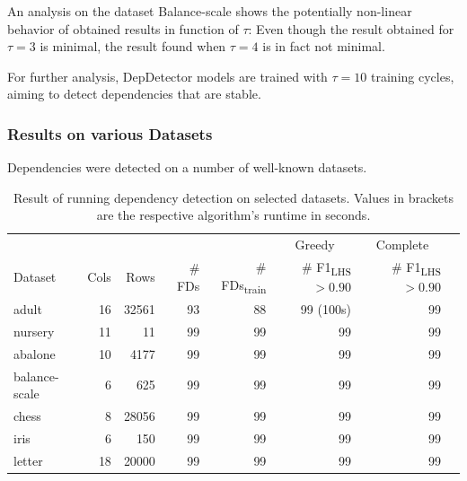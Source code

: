 An analysis on the dataset Balance-scale shows the potentially non-linear behavior of obtained results in function of \( \tau \):
Even though the result obtained for \( \tau = 3 \) is minimal, the result found when \( \tau = 4 \) is in fact not minimal.

For further analysis, DepDetector models are trained with \( \tau = 10 \) training cycles, aiming to detect dependencies that are stable.

\subsubsection{Results on various Datasets}
Dependencies were detected on a number of well-known datasets.
\begin{table}[ht]
    \centering
    \begin{tabular}{lrrrrrrr}
        \toprule
        & & & & & \multicolumn{1}{c}{Greedy} & \multicolumn{1}{c}{Complete} \\
        Dataset & Cols & Rows & \# FDs & \# FDs\textsubscript{train} & \# F1\textsubscript{LHS} $> 0.90$ & \# F1\textsubscript{LHS} $> 0.90$ \\
        \midrule
        adult & 16 & 32561 & 93 & 88 & 99 (100s)& 99 \\
        nursery & 11 & 11 & 99 & 99 & 99 & 99 \\
        abalone & 10 & 4177 & 99 & 99 & 99 & 99 \\
        balance-scale & 6 & 625 & 99 & 99 & 99 & 99 \\
        chess & 8 & 28056 & 99 & 99 & 99 & 99 \\
        iris & 6 & 150 & 99 & 99 & 99 & 99 \\
        letter & 18 & 20000 & 99 & 99 & 99 & 99 \\
        \bottomrule
    \end{tabular}
    \caption{Result of running dependency detection on selected datasets. Values in brackets are the respective algorithm's runtime in seconds.}\label{tab:dep-detection-performance}
\end{table}
